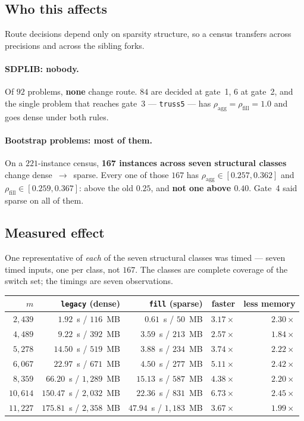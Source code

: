 \documentclass[11pt]{article}
\newcommand{\aggr}{\rho_{\mathrm{agg}}}
\newcommand{\rfill}{\rho_{\mathrm{fill}}}
\newcommand{\code}[1]{\texttt{#1}}
\begin{document}
\subsection{Who this affects}

Route decisions depend only on sparsity structure, so a census transfers across precisions and
across the sibling forks.

\paragraph{SDPLIB: nobody.} Of $92$ problems, \textbf{none} change route. $84$ are decided at
gate~1, $6$ at gate~2, and the single problem that reaches gate~3 --- \code{truss5} --- has
$\aggr = \rfill = 1.0$ and goes dense under both rules.

\paragraph{Bootstrap problems: most of them.} On a $221$-instance census, \textbf{167 instances
across seven structural classes} change dense~$\rightarrow$~sparse. Every one of those $167$ has
$\aggr \in [0.257, 0.362]$ and $\rfill \in [0.259, 0.367]$: above the old $0.25$, and
\textbf{not one above $0.40$}. Gate~4 said sparse on all of them.

\subsection{Measured effect}

One representative of \emph{each} of the seven structural classes was timed --- seven timed inputs,
one per class, not $167$. The classes are complete coverage of the switch set; the timings are
seven observations.

\begin{center}\small
\begin{tabular}{rrrrr}
\toprule
$m$ & \code{legacy} (dense) & \code{fill} (sparse) & faster & less memory \\
\midrule
$2{,}439$  & $1.92$~s / $116$~MB    & $0.61$~s / $50$~MB     & $3.17\times$ & $2.30\times$ \\
$4{,}489$  & $9.22$~s / $392$~MB    & $3.59$~s / $213$~MB    & $2.57\times$ & $1.84\times$ \\
$5{,}278$  & $14.50$~s / $519$~MB   & $3.88$~s / $234$~MB    & $3.74\times$ & $2.22\times$ \\
$6{,}067$  & $22.97$~s / $671$~MB   & $4.50$~s / $277$~MB    & $5.11\times$ & $2.42\times$ \\
$8{,}359$  & $66.20$~s / $1{,}289$~MB & $15.13$~s / $587$~MB & $4.38\times$ & $2.20\times$ \\
$10{,}614$ & $150.47$~s / $2{,}032$~MB & $22.36$~s / $831$~MB & $6.73\times$ & $2.45\times$ \\
$11{,}227$ & $175.81$~s / $2{,}358$~MB & $47.94$~s / $1{,}183$~MB & $3.67\times$ & $1.99\times$ \\
\bottomrule
\end{tabular}
\end{center}
\end{document}

